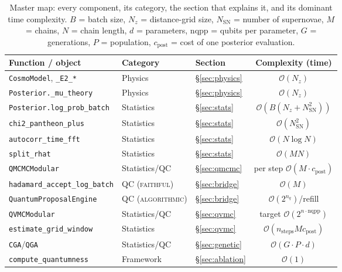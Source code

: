 \documentclass[11pt]{article}
\newcommand{\code}[1]{\texttt{#1}}
\newcommand{\bigO}{\mathcal{O}}
\newcommand{\faithful}{\textsc{faithful}}
\newcommand{\algorithmic}{\textsc{algorithmic}}
\begin{document}
\begin{table}[h]
\centering
\footnotesize
\begin{tabular}{@{}lllc@{}}
\toprule
\textbf{Function / object} & \textbf{Category} & \textbf{Section} & \textbf{Complexity (time)}\\
\midrule
\code{CosmoModel}, \code{\_E2\_*}        & Physics    & \S\ref{sec:physics}  & $\bigO(N_z)$ \\
\code{Posterior.\_mu\_theory}            & Physics    & \S\ref{sec:physics}  & $\bigO(N_z)$ \\
\code{Posterior.log\_prob\_batch}        & Statistics & \S\ref{sec:stats}    & $\bigO(B(N_z{+}N_{\mathrm{SN}}^2))$ \\
\code{chi2\_pantheon\_plus}              & Statistics & \S\ref{sec:stats}    & $\bigO(N_{\mathrm{SN}}^2)$ \\
\code{autocorr\_time\_fft}               & Statistics & \S\ref{sec:stats}    & $\bigO(N\log N)$ \\
\code{split\_rhat}                       & Statistics & \S\ref{sec:stats}    & $\bigO(MN)$ \\
\code{QMCMCModular}                      & Statistics/QC & \S\ref{sec:qmcmc} & per step $\bigO(M\cdot c_{\mathrm{post}})$ \\
\code{hadamard\_accept\_log\_batch}      & QC (\faithful) & \S\ref{sec:bridge} & $\bigO(M)$ \\
\code{QuantumProposalEngine}             & QC (\algorithmic) & \S\ref{sec:bridge} & $\bigO(2^{n_q})$/refill \\
\code{QVMCModular}                       & Statistics/QC & \S\ref{sec:qvmc}  & target $\bigO(2^{n\cdot\mathrm{nqpp}})$ \\
\code{estimate\_grid\_window}            & Statistics & \S\ref{sec:qvmc}     & $\bigO(n_{\mathrm{steps}}M c_{\mathrm{post}})$ \\
\code{CGA}/\code{QGA}                    & Statistics/QC & \S\ref{sec:genetic} & $\bigO(G\cdot P\cdot d)$ \\
\code{compute\_quantumness}              & Framework  & \S\ref{sec:ablation} & $\bigO(1)$ \\
\bottomrule
\end{tabular}
\caption{Master map: every component, its category, the section that explains
it, and its dominant time complexity. $B$ = batch size, $N_z$ = distance-grid
size, $N_{\mathrm{SN}}$ = number of supernovae, $M$ = chains, $N$ = chain
length, $d$ = parameters, $\mathrm{nqpp}$ = qubits per parameter, $G$ =
generations, $P$ = population, $c_{\mathrm{post}}$ = cost of one posterior
evaluation.}
\label{tab:map}
\end{table}
\end{document}
